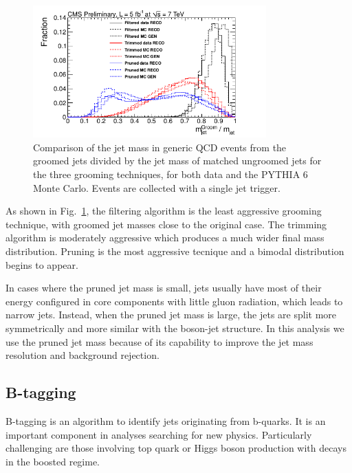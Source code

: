 \begin{figure}[hbtp]
  \begin{center}
    \includegraphics[width=0.8\textwidth]{figure/CH3/JetGrooming.png}
  \end{center}
  \caption{\label{fig:JetGrooming}Comparison of the jet mass in generic QCD events from the groomed jets divided by the jet mass of matched ungroomed jets for the three grooming techniques, for both data and the PYTHIA 6 Monte Carlo.\cite{SMP-12-019} Events are collected with a single jet trigger.}
\end{figure}

As shown in Fig.~\ref{fig:JetGrooming}, the filtering algorithm is the least aggressive grooming technique, with groomed jet masses close to the original case. The trimming algorithm is moderately aggressive which produces a much wider final mass distribution. Pruning is the most aggressive tecnique and a bimodal distribution begins to appear.

In cases where the pruned jet mass is small, jets usually have most of their energy configured in core components with little gluon radiation, which leads to narrow jets. Instead, when the pruned jet mass is large, the jets are split more symmetrically and more similar with the boson-jet structure. In this analysis we use the pruned jet mass because of its capability to improve the jet mass resolution and background rejection.

\subsection{B-tagging}

B-tagging\cite{btagAlgo,BTV-13-001} is an algorithm to identify jets originating from b-quarks. It is an important component in analyses searching for new physics. Particularly challenging are those involving top quark or Higgs boson production with decays in the boosted regime.

